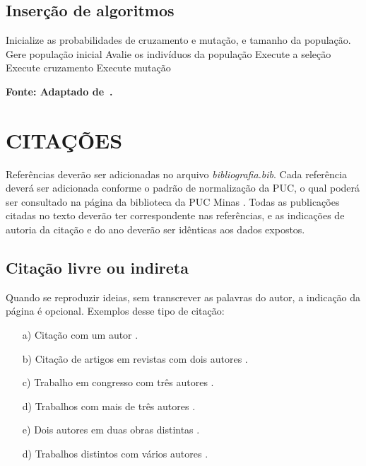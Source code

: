 \section{\esp Inserção de algoritmos}

\begin{algoritmo}
	\footnotesize
	\label{alg:ag}
    \begin{algorithmic}[1]
    		\State Inicialize as probabilidades de cruzamento e mutação, e tamanho da população.
		\State Gere população inicial
			\State Avalie os indivíduos da população
			\State Execute a seleção
			\State Execute cruzamento
			\State Execute mutação
		\EndWhile{}
  	\end{algorithmic}
	\textbf{\small{Fonte: Adaptado de~.}}
\end{algoritmo}

\chapter{ CITAÇÕES}


Referências deverão ser adicionadas no arquivo \textit{bibliografia.bib}. Cada referência deverá ser adicionada conforme o padrão de normalização da PUC, 
o qual poderá ser consultado na página da biblioteca da PUC Minas \cite{manualpuc}. Todas as publicações citadas no texto deverão ter correspondente nas referências, 
e as indicações de autoria da citação e do ano deverão ser idênticas aos dados expostos.


\section{\esp Citação livre ou indireta}

Quando se reproduzir ideias, sem transcrever as palavras do autor, a indicação da página é opcional. Exemplos desse tipo de citação:
\begin{enumerate} 
 \item [a)] Citação com um autor \cite{knuth}. 
 \item [b)] Citação de artigos em revistas com dois autores \cite{artigo01}.
  \item [c)] Trabalho em congresso com três autores \cite{dovzan:01}.
 \item [d)] Trabalhos com mais de três autores \cite{cap-livro}.
 \item [e)] Dois autores em duas obras distintas \cite{knuth,groupp}.
 \item [d)] Trabalhos distintos com vários autores \cite{congresso,cap-livro}.
 
\end{enumerate}

